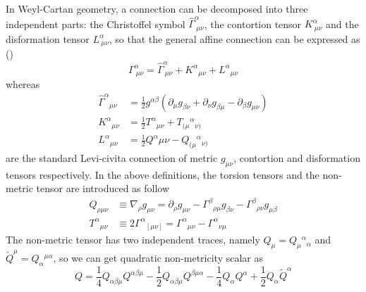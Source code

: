 \documentclass[manuscript]{aastex631}
\begin{document}
In Weyl-Cartan geometry, a connection
can be decomposed into three independent parts: the Christoffel symbol $\hat{\Gamma}^\alpha_{\ \mu \nu}$, the contortion tensor $K^\alpha_{\ \mu \nu}$ and the disformation tensor $L^\alpha_{\ \mu \nu}$, so that the general affine connection can be expressed as (\cite{J_rv_2018})
\begin{equation}
    \Gamma^\alpha_{\ \mu \nu}=\hat{\Gamma}^\alpha_{\ \mu \nu}+K^{\alpha}{}_{\mu \nu}+L^\alpha{}_{\mu \nu}
\end{equation}
whereas
\begin{align}
\hat{\Gamma}^\alpha{}_{\mu \nu}& =\frac{1}{2}g^{\alpha \beta}(\partial_\mu g_{\beta \nu}+\partial_\nu g_{\beta \mu}-\partial_\beta g_{\mu \nu}) \\
K^{\alpha }{}_{\mu \nu }& = \frac{1}{2}T^{\alpha }{}_{\mu \nu }+T_{(\mu}{}^{\alpha }{}_{\nu )} \\
L^{\alpha}{}_{\mu\nu}& = \frac{1}{2}Q^{\alpha}_{}{\mu\nu}-Q_{(\mu}{}^{\alpha }{}_{\nu)}
\end{align}
are the standard Levi-civita connection of metric $g_{\mu \nu}$, contortion and disformation tensors respectively.
In the above definitions, the torsion tensors and the non-metric tensor are introduced as follow
\begin{align}
Q_{\rho \mu\nu} &\equiv \nabla_{\rho} g_{\mu\nu} = \partial_\rho g_{\mu\nu} - \Gamma^\beta{}_{\rho \mu} g_{\beta\nu} - \Gamma^\beta{}_{\rho\nu} g_{\mu\beta}\\
T^{\alpha}{}_{\mu\nu} &\equiv 2\Gamma^{\alpha}{}_{[\mu\nu]} =\Gamma^{\alpha}{}_{\mu\nu}-\Gamma^{\alpha}{}_{\nu\mu}
\end{align}
The non-metric tensor has two independent traces, namely $Q_{\mu}=Q_{\mu}{}^{\alpha}{}_{\alpha}$ and $\tilde{Q}^{\mu}=Q_{\alpha}{}^{\mu \alpha}$, so we can get quadratic non-metricity scalar as
\begin{equation}
    Q=\dfrac{1}{4}Q_{\alpha\beta\mu}Q^{\alpha\beta\mu}-\dfrac{1}{2}Q_{\alpha\beta\mu}Q^{\beta\mu\alpha}-\dfrac{1}{4}Q_{\alpha}Q^{\alpha}+\dfrac{1}{2}Q_{\alpha}\tilde{Q}^\alpha 
\end{equation} 
\end{document}
